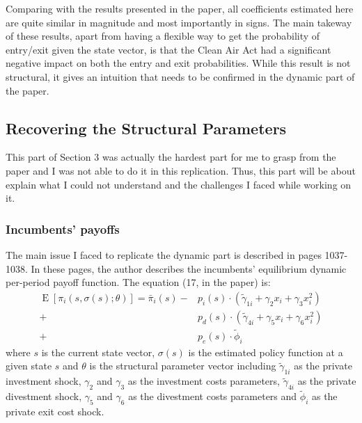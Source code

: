 \documentclass[12pt]{article}
\newcommand{\E}[1]{\operatorname{E}\left[#1\right]}
\begin{document}
Comparing with the results presented in the paper, all coefficients estimated here are quite similar in magnitude and most importantly in signs. The main takeway of these results, apart from having a flexible way to get the probability of entry/exit given the state vector, is that the Clean Air Act had a significant negative impact on both the entry and exit probabilities. While this result is not structural, it gives an intuition that needs to be confirmed in the dynamic part of the paper.

\subsection{Recovering the Structural Parameters}

This part of Section 3 was actually the hardest part for me to grasp from the paper and I was not able to do it in this replication. Thus, this part will be about explain what I could not understand and the challenges I faced while working on it.

\subsubsection{Incumbents' payoffs}

The main issue I faced to replicate the dynamic part is described in pages 1037-1038. In these pages, the author describes the incumbents' equilibrium dynamic per-period payoff function. The equation (17, in the paper) is: \begin{align*}
\E{\pi_i(s, \sigma(s); \theta)} = \bar \pi_i(s) - & p_i(s) \cdot(\tilde \gamma_{1i} + \gamma_2 x_i + \gamma_3 x_i^2) \\ +  & p_d(s) \cdot(\tilde \gamma_{4i} + \gamma_5 x_i + \gamma_6 x_i^2) \\ + & p_e(s)\cdot \tilde{\phi}_i
\end{align*} where $s$ is the current state vector, $\sigma(s)$ is the estimated policy function at a given state $s$ and $\theta$ is the structural parameter vector including $\tilde \gamma_{1i}$ as the private investment shock, $\gamma_2$ and $\gamma_3$ as the investment costs parameters, $\tilde \gamma_{4i}$ as the private divestment shock, $\gamma_5$ and $\gamma_6$ as the divestment costs parameters and $\tilde{\phi}_i$ as the private exit cost shock.
\end{document}
